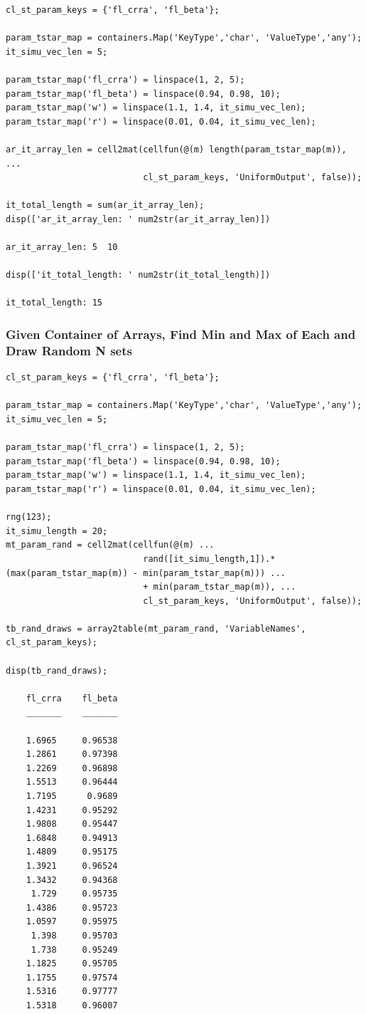 \documentclass[
]{book}
\begin{document}
\begin{verbatim}
cl_st_param_keys = {'fl_crra', 'fl_beta'};

param_tstar_map = containers.Map('KeyType','char', 'ValueType','any');
it_simu_vec_len = 5;

param_tstar_map('fl_crra') = linspace(1, 2, 5);
param_tstar_map('fl_beta') = linspace(0.94, 0.98, 10);
param_tstar_map('w') = linspace(1.1, 1.4, it_simu_vec_len);
param_tstar_map('r') = linspace(0.01, 0.04, it_simu_vec_len);

ar_it_array_len = cell2mat(cellfun(@(m) length(param_tstar_map(m)), ...
                           cl_st_param_keys, 'UniformOutput', false));

it_total_length = sum(ar_it_array_len);
disp(['ar_it_array_len: ' num2str(ar_it_array_len)])

ar_it_array_len: 5  10

disp(['it_total_length: ' num2str(it_total_length)])

it_total_length: 15
\end{verbatim}

\hypertarget{given-container-of-arrays-find-min-and-max-of-each-and-draw-random-n-sets}{%
\subsubsection{Given Container of Arrays, Find Min and Max of Each and Draw Random N sets}\label{given-container-of-arrays-find-min-and-max-of-each-and-draw-random-n-sets}}

\begin{verbatim}
cl_st_param_keys = {'fl_crra', 'fl_beta'};

param_tstar_map = containers.Map('KeyType','char', 'ValueType','any');
it_simu_vec_len = 5;

param_tstar_map('fl_crra') = linspace(1, 2, 5);
param_tstar_map('fl_beta') = linspace(0.94, 0.98, 10);
param_tstar_map('w') = linspace(1.1, 1.4, it_simu_vec_len);
param_tstar_map('r') = linspace(0.01, 0.04, it_simu_vec_len);

rng(123);
it_simu_length = 20;
mt_param_rand = cell2mat(cellfun(@(m) ...
                           rand([it_simu_length,1]).*(max(param_tstar_map(m)) - min(param_tstar_map(m))) ...
                           + min(param_tstar_map(m)), ...
                           cl_st_param_keys, 'UniformOutput', false));

tb_rand_draws = array2table(mt_param_rand, 'VariableNames', cl_st_param_keys);

disp(tb_rand_draws);

    fl_crra    fl_beta
    _______    _______

    1.6965     0.96538
    1.2861     0.97398
    1.2269     0.96898
    1.5513     0.96444
    1.7195      0.9689
    1.4231     0.95292
    1.9808     0.95447
    1.6848     0.94913
    1.4809     0.95175
    1.3921     0.96524
    1.3432     0.94368
     1.729     0.95735
    1.4386     0.95723
    1.0597     0.95975
     1.398     0.95703
     1.738     0.95249
    1.1825     0.95705
    1.1755     0.97574
    1.5316     0.97777
    1.5318     0.96007
\end{verbatim}
\end{document}
